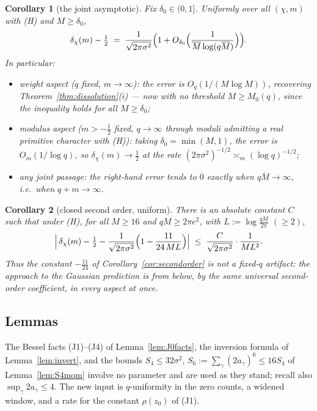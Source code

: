 \documentclass[11pt]{article}
\newtheorem{corollary}{Corollary}
\begin{document}
\begin{corollary}[the joint asymptotic]\label{cor:joint-asymp}
Fix $\delta_0\in(0,1]$. Uniformly over all $(\chi,m)$ with (H) and
$M\ge\delta_0$,
\[
\delta_\chi(m)-\tfrac12
\;=\;\frac{1}{\sqrt{2\pi\sigma^{2}}}
\Bigl(1+O_{\delta_0}\Bigl(
\frac{1}{\overline M\log(q\overline M)}\Bigr)\Bigr).
\]
In particular:
\begin{itemize}
\item[(a)] \emph{weight aspect} ($q$ fixed, $m\to\infty$): the error is
$O_q(1/(M\log M))$, recovering Theorem~\ref{thm:dissolution}(i) ---
now with no threshold $M\ge M_0(q)$, since the inequality holds for
all $M\ge\delta_0$;
\item[(b)] \emph{modulus aspect} ($m>-\tfrac12$ fixed, $q\to\infty$
through moduli admitting a real primitive character with (H)): taking
$\delta_0=\min(M,1)$, the error is $O_m(1/\log q)$, so
$\delta_\chi(m)\to\tfrac12$ at the rate $(2\pi\sigma^2)^{-1/2}
\asymp_m(\log q)^{-1/2}$;
\item[(c)] any joint passage: the right-hand error tends to $0$
exactly when $q\overline M\to\infty$, i.e.\ when $q+m\to\infty$.
\end{itemize}
\end{corollary}

\begin{corollary}[closed second order, uniform]\label{cor:joint-second}
There is an absolute constant $C$ such that under (H), for all
$M\ge16$ and $qM\ge2\pi e^{2}$, with $L:=\log\tfrac{qM}{2\pi}$
$(\ge2)$,
\[
\Bigl|\,\delta_\chi(m)-\tfrac12
-\frac{1}{\sqrt{2\pi\sigma^{2}}}
\Bigl(1-\frac{11}{24\,ML}\Bigr)\Bigr|
\;\le\;\frac{C}{\sqrt{2\pi\sigma^{2}}}\cdot\frac{1}{ML^{2}} .
\]
Thus the constant $-\tfrac{11}{24}$ of Corollary~\ref{cor:secondorder}
is not a fixed-$q$ artifact: the approach to the Gaussian prediction is
from below, by the same universal second-order coefficient, in every
aspect at once.
\end{corollary}

\subsection*{Lemmas}

The Bessel facts (J1)--(J4) of Lemma~\ref{lem:J0facts}, the inversion
formula of Lemma~\ref{lem:invert}, and the bounds
$S_4\le32\sigma^2$, $S_6:=\sum_\gamma(2a_\gamma)^6\le16S_4$ of
Lemma~\ref{lem:S4mom} involve no parameter and are used as they stand;
recall also $\sup_\gamma 2a_\gamma\le4$. The new input is
$q$-uniformity in the zero counts, a widened window, and a rate for
the constant $\rho(z_0)$ of (J1).
\end{document}
